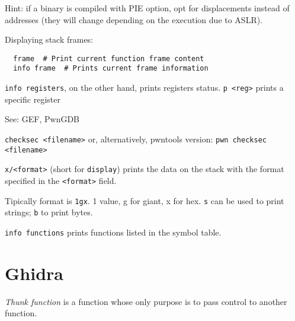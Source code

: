 Hint: if a binary is compiled with PIE option, opt for displacements instead of addresses (they will change depending on the execution due to ASLR).

Displaying stack frames:
\begin{verbatim}
  frame  # Print current function frame content
  info frame  # Prints current frame information
\end{verbatim}

\texttt{info registers}, on the other hand, prints registers status. \texttt{p <reg>} prints a specific register

See: GEF, PwnGDB

\texttt{checksec <filename>} or, alternatively, pwntools version: \texttt{pwn checksec <filename>}

\texttt{x/<format>} (short for \texttt{display}) prints the data on the stack with the format specified in the \texttt{<format>} field.

Tipically format is \texttt{1gx}. 1 value, g for giant, x for hex. \texttt{s} can be used to print strings; \texttt{b} to print bytes.

\texttt{info functions} prints functions listed in the symbol table.

\section{Ghidra}
\textit{Thunk function} is a function whose only purpose is to pass control to another function.
